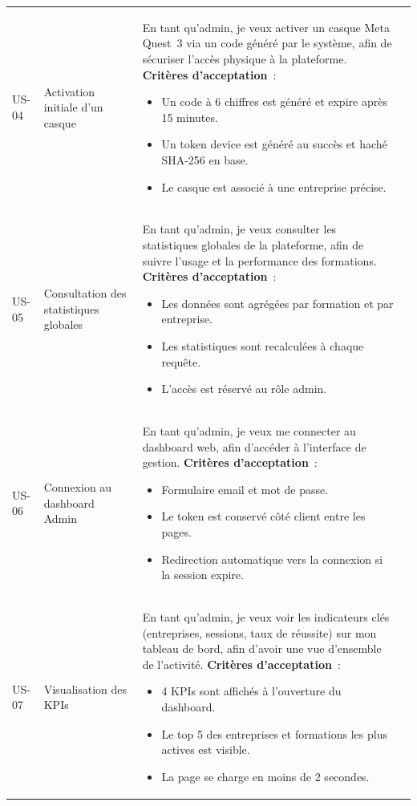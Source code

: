 \begin{longtable}{lp{2.8cm}p{8cm}l}
  US-04 & Activation initiale d'un casque &
    En tant qu'admin, je veux activer un casque Meta Quest~3 via un
    code généré par le système, afin de sécuriser l'accès physique à
    la plateforme.
    \newline\textbf{Critères d'acceptation}~:
    \begin{itemize}
      \item Un code à 6 chiffres est généré et expire après 15 minutes.
      \item Un token device est généré au succès et haché SHA-256 en base.
      \item Le casque est associé à une entreprise précise.
    \end{itemize}
    & \must{} \\[4pt]

  US-05 & Consultation des statistiques globales &
    En tant qu'admin, je veux consulter les statistiques globales de
    la plateforme, afin de suivre l'usage et la performance des
    formations.
    \newline\textbf{Critères d'acceptation}~:
    \begin{itemize}
      \item Les données sont agrégées par formation et par entreprise.
      \item Les statistiques sont recalculées à chaque requête.
      \item L'accès est réservé au rôle admin.
    \end{itemize}
    & \should{} \\[4pt]

  US-06 & Connexion au dashboard Admin &
    En tant qu'admin, je veux me connecter au dashboard web, afin
    d'accéder à l'interface de gestion.
    \newline\textbf{Critères d'acceptation}~:
    \begin{itemize}
      \item Formulaire email et mot de passe.
      \item Le token est conservé côté client entre les pages.
      \item Redirection automatique vers la connexion si la session expire.
    \end{itemize}
    & \must{} \\[4pt]

  US-07 & Visualisation des KPIs &
    En tant qu'admin, je veux voir les indicateurs clés (entreprises,
    sessions, taux de réussite) sur mon tableau de bord, afin d'avoir
    une vue d'ensemble de l'activité.
    \newline\textbf{Critères d'acceptation}~:
    \begin{itemize}
      \item 4 KPIs sont affichés à l'ouverture du dashboard.
      \item Le top 5 des entreprises et formations les plus actives
        est visible.
      \item La page se charge en moins de 2 secondes.
    \end{itemize}
    & \must{} \\[4pt]


\end{longtable}
